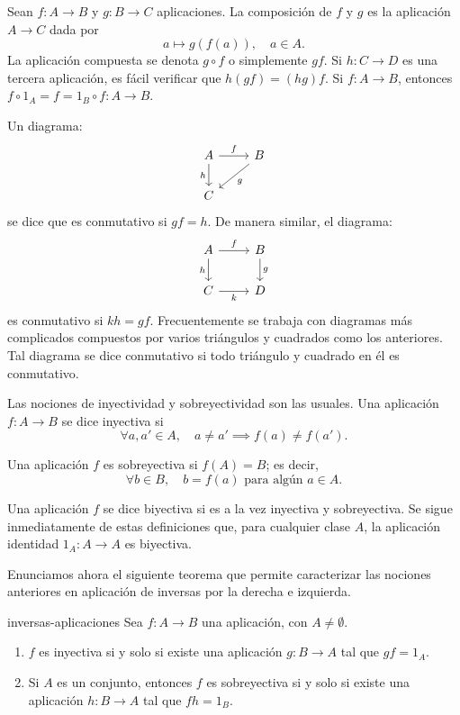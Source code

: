 Sean \( f: A \to B \) y \( g: B \to C \) aplicaciones. La {composición} de \( f \) y \( g \) es la aplicación \( A \to C \) dada por
\[
a \mapsto g(f(a)), \quad a \in A.
\]
La aplicación compuesta se denota \( g \circ f \) o simplemente \( gf \). Si \( h: C \to D \) es una tercera aplicación, es fácil verificar que \( h(gf) = (hg)f \). Si \( f: A \to B \), entonces \( f \circ 1_A = f = 1_B \circ f: A \to B \).

Un diagrama:
\[
    \begin{tikzcd}
    A \arrow{r}{f} \arrow[swap]{d}{h} & B \arrow{dl}{g} \\
    C
  \end{tikzcd}
\]
se dice que es conmutativo si \( gf = h \). De manera similar, el diagrama:
\[
\begin{tikzcd}
    A \arrow{r}{f} \arrow[swap]{d}{h} & B \arrow{d}{g} \\
    C \arrow[swap]{r}{k} & D 
  \end{tikzcd}
\]
es conmutativo si \( kh = gf \). Frecuentemente se trabaja con diagramas más complicados compuestos por varios triángulos y cuadrados como los anteriores. Tal diagrama se dice conmutativo si todo triángulo y cuadrado en él es conmutativo.

Las nociones de inyectividad y sobreyectividad son las usuales. Una aplicación \( f: A \to B \) se dice inyectiva si
\[
\forall a, a' \in A, \quad a \neq a' \implies f(a) \neq f(a').
\]

Una aplicación \( f \) es sobreyectiva si \( f(A) = B \); es decir,
\[
\forall b \in B, \quad b = f(a) \text{ para algún } a \in A.
\]

Una aplicación \( f \) se dice biyectiva si es a la vez inyectiva y sobreyectiva. Se sigue inmediatamente de estas definiciones que, para cualquier clase \( A \), la aplicación identidad \( 1_A: A \to A \) es biyectiva.

Enunciamos ahora el siguiente teorema que permite caracterizar las nociones anteriores en aplicación de inversas por la derecha e izquierda.

\begin{theorem}{}{inversas-aplicaciones}
    Sea \( f: A \to B \) una aplicación, con \( A \neq \emptyset \).
    \begin{enumerate}
        \item \( f \) es inyectiva si y solo si existe una aplicación \( g: B \to A \) tal que \( gf = 1_A \).

        \item Si \( A \) es un conjunto, entonces \( f \) es sobreyectiva si y solo si existe una aplicación \( h: B \to A \) tal que \( fh = 1_B \).
    \end{enumerate}
\end{theorem}

